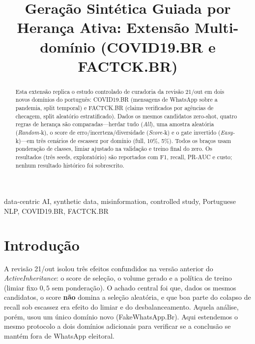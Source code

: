 \documentclass[conference]{IEEEtran}
\begin{document}
\title{Gera\c{c}\~ao Sint\'etica Guiada por Heran\c{c}a Ativa: Extens\~ao Multi-dom\'inio (COVID19.BR e FACTCK.BR)}

\author{
}

\maketitle

\begin{abstract}
Esta extens\~ao replica o estudo controlado de curadoria da revis\~ao 21/out em dois novos dom\'inios do portugu\^es: COVID19.BR (mensagens de WhatsApp sobre a pandemia, split temporal) e FACTCK.BR (claims verificados por ag\^encias de checagem, split aleat\'orio estratificado). Dados os mesmos candidatos zero-shot, quatro regras de heran\c{c}a s\~ao comparadas---herdar tudo (\emph{All}), uma amostra aleat\'oria (\emph{Random-}k), o score de erro/incerteza/diversidade (\emph{Score-}k) e o gate invertido (\emph{Easy-}k)---em tr\^es cen\'arios de escassez por dom\'inio (full, 10\%, 5\%). Todos os bra\c{c}os usam pondera\c{c}\~ao de classes, limiar ajustado na valida\c{c}\~ao e treino final do zero. Os resultados (tr\^es seeds, explorat\'orio) s\~ao reportados com F1, recall, PR-AUC e custo; nenhum resultado hist\'orico foi sobrescrito.
\end{abstract}

\begin{IEEEkeywords}
data-centric AI, synthetic data, misinformation, controlled study, Portuguese NLP, COVID19.BR, FACTCK.BR
\end{IEEEkeywords}

\section{Introdu\c{c}\~ao}

A revis\~ao 21/out isolou tr\^es efeitos confundidos na vers\~ao anterior do \emph{ActiveInheritance}: o score de sele\c{c}\~ao, o volume gerado e a pol\'itica de treino (limiar fixo $0{,}5$ sem pondera\c{c}\~ao). O achado central foi que, dados os mesmos candidatos, o score \textbf{n\~ao} domina a sele\c{c}\~ao aleat\'oria, e que boa parte do colapso de recall sob escassez era efeito do limiar e do desbalanceamento. Aquela an\'alise, por\'em, usou um \'unico dom\'inio novo (FakeWhatsApp.Br). Aqui estendemos o mesmo protocolo a dois dom\'inios adicionais para verificar se a conclus\~ao se mant\'em fora de WhatsApp eleitoral.
\end{document}
